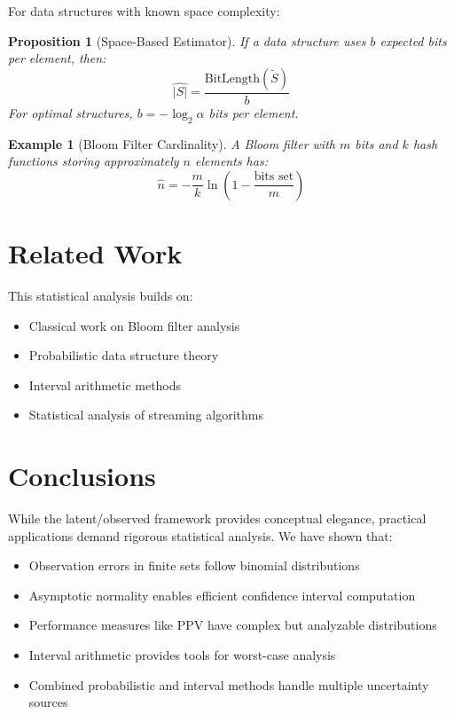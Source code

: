\documentclass[11pt,final,hidelinks]{article}
\newtheorem{proposition}[theorem]{Proposition}
\newtheorem{example}[theorem]{Example}
\newcommand{\obs}[1]{\widetilde{#1}}  %
\newcommand{\fprate}{\alpha}
\begin{document}
For data structures with known space complexity:

\begin{proposition}[Space-Based Estimator]
If a data structure uses $b$ expected bits per element, then:
\begin{equation}
\hat{|S|} = \frac{\text{BitLength}(\obs{S})}{b}
\end{equation}
For optimal structures, $b = -\log_2 \fprate$ bits per element.
\end{proposition}

\begin{example}[Bloom Filter Cardinality]
A Bloom filter with $m$ bits and $k$ hash functions storing approximately $n$ elements has:
\begin{equation}
\hat{n} = -\frac{m}{k} \ln\left(1 - \frac{\text{bits set}}{m}\right)
\end{equation}
\end{example}

\section{Related Work}

This statistical analysis builds on:
\begin{itemize}
    \item Classical work on Bloom filter analysis \cite{bloom1970,mitzenmacher2002}
    \item Probabilistic data structure theory \cite{broder2004}
    \item Interval arithmetic methods \cite{moore1966}
    \item Statistical analysis of streaming algorithms \cite{cormode2005}
\end{itemize}

\section{Conclusions}

While the latent/observed framework provides conceptual elegance, practical applications demand rigorous statistical analysis. We have shown that:

\begin{itemize}
    \item Observation errors in finite sets follow binomial distributions
    \item Asymptotic normality enables efficient confidence interval computation
    \item Performance measures like PPV have complex but analyzable distributions
    \item Interval arithmetic provides tools for worst-case analysis
    \item Combined probabilistic and interval methods handle multiple uncertainty sources
\end{itemize}
\end{document}

